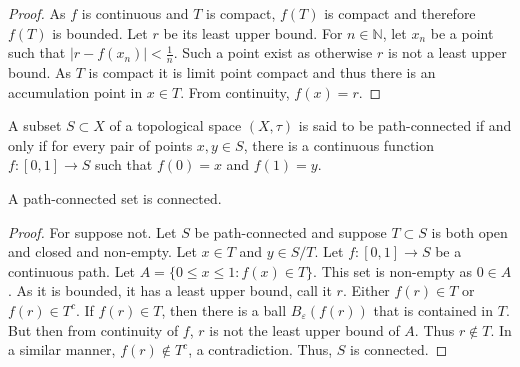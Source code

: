 \documentclass[crop=false,class=book,oneside]{standalone}
\begin{document}
            \begin{proof}
            As $f$ is continuous and $T$ is compact, $f(T)$ is compact and therefore $f(T)$ is bounded. Let $r$ be its least upper bound. For $n\in \mathbb{N}$, let $x_n$ be a point such that $|r-f(x_n)|< \frac{1}{n}$. Such a point exist as otherwise $r$ is not a least upper bound. As $T$ is compact it is limit point compact and thus there is an accumulation point in $x\in T$. From continuity, $f(x) = r$.
            \end{proof}
            \begin{definition}
            A subset $S\subset X$ of a topological space $(X,\tau)$ is said to be path-connected if and only if for every pair of points $x,y\in S$, there is a continuous function $f:[0,1]\rightarrow S$ such that $f(0)=x$ and $f(1)=y$.
            \end{definition}
            \begin{theorem}
            A path-connected set is connected.
            \end{theorem}
            \begin{proof}
            For suppose not. Let $S$ be path-connected and suppose $T\subset S$ is both open and closed and non-empty. Let $x\in T$ and $y\in S/T$. Let $f:[0,1]\rightarrow S$ be a continuous path. Let $A =\{0\leq x \leq 1: f(x) \in T\}$. This set is non-empty as $0\in A$. As it is bounded, it has a least upper bound, call it $r$. Either $f(r)\in T$ or $f(r)\in T^c$. If $f(r)\in T$, then there is a ball $B_{\varepsilon}(f(r))$ that is contained in $T$. But then from continuity of $f$, $r$ is not the least upper bound of $A$. Thus $r\notin T$. In a similar manner, $f(r)\notin T^c$, a contradiction. Thus, $S$ is connected.
            \end{proof}
\end{document}
